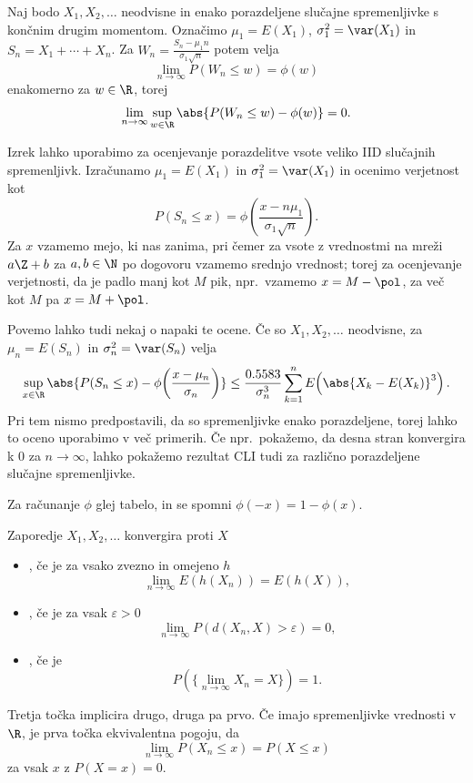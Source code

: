 
\begin{izrek}
  Naj bodo $X_1, X_2, \ldots$ neodvisne in enako porazdeljene slučajne
  spremenljivke s končnim drugim momentom.
  Označimo $\mu_1 = E(X_1)$, $\sigma_1^2 = \var(X_1)$ in $S_n = X_1 + \cdots +
  X_n$.
  Za $W_n = \frac{S_n - \mu_1 n}{\sigma_1 \sqrt{n}}$ potem velja
  \[
	\lim_{n \to \infty} P(W_n \le w) = \phi(w)
  \]
  enakomerno za $w \in \R$, torej
  \[
	\lim_{n \to \infty} \sup_{w \in \R} \abs{P(W_n \le w) - \phi(w)}
	= 0.
  \]
\end{izrek}

Izrek lahko uporabimo za ocenjevanje porazdelitve vsote veliko IID slučajnih
spremenljivk.
Izračunamo $\mu_1 = E(X_1)$ in $\sigma_1^2 = \var(X_1)$ in ocenimo verjetnost
kot
\[
  P(S_n \le x) = \phi\!\left( \frac{x - n \mu_1}{\sigma_1 \sqrt{n}} \right).
\]
Za $x$ vzamemo mejo, ki nas zanima, pri čemer za vsote z vrednostmi na mreži $a
\Z + b$ za $a, b \in \N$ po dogovoru vzamemo srednjo vrednost; torej za
ocenjevanje verjetnosti, da je padlo manj kot $M$ pik, npr.~vzamemo $x = M -
\pol$, za več kot $M$ pa $x = M + \pol$.

Povemo lahko tudi nekaj o napaki te ocene.
Če so $X_1, X_2, \ldots$ neodvisne, za $\mu_n = E(S_n)$ in $\sigma_n^2 =
\var(S_n)$ velja
\[
  \sup_{x \in \R} \abs{ P(S_n \le x) - \phi\!\left( \frac{x - \mu_n}{\sigma_n}
	\right) }
  \le \frac{0.5583}{\sigma_n^3} \sum_{k=1}^n E\!\left( \abs{X_k - E(X_k)}^3 \right).
\]
Pri tem nismo predpostavili, da so spremenljivke enako porazdeljene, torej lahko
to oceno uporabimo v več primerih.
Če npr.~pokažemo, da desna stran konvergira k $0$ za $n \to \infty$, lahko
pokažemo rezultat CLI tudi za različno porazdeljene slučajne spremenljivke.

Za računanje $\phi$ glej tabelo, in se spomni $\phi(-x) = 1 - \phi(x)$.


Zaporedje $X_1, X_2, \ldots$ konvergira proti $X$
\begin{itemize}
\item {}, če je za vsako zvezno in omejeno $h$
  \[
	\lim_{n \to \infty} E(h(X_n)) = E(h(X)),
  \]
\item {}, če je za vsak $\varepsilon > 0$
  \[
	\lim_{n \to \infty} P(d(X_n, X) > \varepsilon) = 0,
  \]
\item {}, če je
  \[
	P\!\left( \{ \lim_{n \to \infty} X_n = X \} \right) = 1.
  \]
\end{itemize}
Tretja točka implicira drugo, druga pa prvo.
Če imajo spremenljivke vrednosti v $\R$, je prva točka ekvivalentna pogoju, da
\[
  \lim_{n \to \infty} P(X_n \le x) = P(X \le x)
\]
za vsak $x$ z $P(X=x) = 0$.

